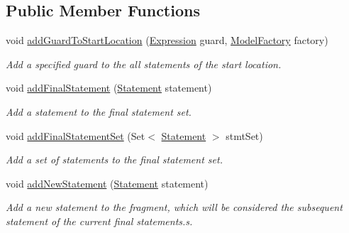 \subsection*{Public Member Functions}
\begin{DoxyCompactItemize}
\item 
void \hyperlink{interfaceedu_1_1udel_1_1cis_1_1vsl_1_1civl_1_1model_1_1IF_1_1Fragment_a3464111d435dd0154db446e85638598e}{add\+Guard\+To\+Start\+Location} (\hyperlink{interfaceedu_1_1udel_1_1cis_1_1vsl_1_1civl_1_1model_1_1IF_1_1expression_1_1Expression}{Expression} guard, \hyperlink{interfaceedu_1_1udel_1_1cis_1_1vsl_1_1civl_1_1model_1_1IF_1_1ModelFactory}{Model\+Factory} factory)
\begin{DoxyCompactList}\small\item\em Add a specified guard to the all statements of the start location. \end{DoxyCompactList}\item 
void \hyperlink{interfaceedu_1_1udel_1_1cis_1_1vsl_1_1civl_1_1model_1_1IF_1_1Fragment_aa74a16c438c58c640751ea96744f98bd}{add\+Final\+Statement} (\hyperlink{interfaceedu_1_1udel_1_1cis_1_1vsl_1_1civl_1_1model_1_1IF_1_1statement_1_1Statement}{Statement} statement)
\begin{DoxyCompactList}\small\item\em Add a statement to the final statement set. \end{DoxyCompactList}\item 
void \hyperlink{interfaceedu_1_1udel_1_1cis_1_1vsl_1_1civl_1_1model_1_1IF_1_1Fragment_a4933d2d1a1e0bc0a00e360537cc5b997}{add\+Final\+Statement\+Set} (Set$<$ \hyperlink{interfaceedu_1_1udel_1_1cis_1_1vsl_1_1civl_1_1model_1_1IF_1_1statement_1_1Statement}{Statement} $>$ stmt\+Set)
\begin{DoxyCompactList}\small\item\em Add a set of statements to the final statement set. \end{DoxyCompactList}\item 
void \hyperlink{interfaceedu_1_1udel_1_1cis_1_1vsl_1_1civl_1_1model_1_1IF_1_1Fragment_a6b06d327a6ed3206196e30284d81f1ce}{add\+New\+Statement} (\hyperlink{interfaceedu_1_1udel_1_1cis_1_1vsl_1_1civl_1_1model_1_1IF_1_1statement_1_1Statement}{Statement} statement)
\begin{DoxyCompactList}\small\item\em Add a new statement to the fragment, which will be considered the subsequent statement of the current final statements.\+s. \end{DoxyCompactList}\item 

\end{DoxyCompactItemize}
